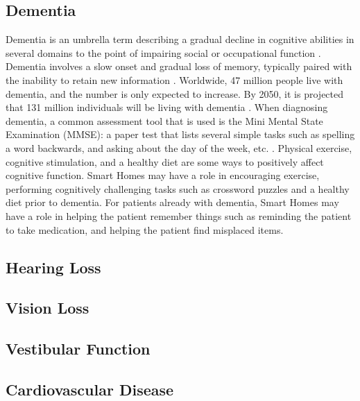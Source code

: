 \subsection{Dementia}
Dementia is an umbrella term describing a gradual decline in cognitive abilities in several domains to the point of impairing social or occupational function \cite{noauthor_diagnosis_nodate}. Dementia involves a slow onset and gradual loss of memory, typically paired with the inability to retain new information \cite{noauthor_diagnosis_nodate}. Worldwide, 47 million people live with dementia, and the number is only expected to increase. By 2050, it is projected that 131 million individuals will be living with dementia \cite{noauthor_diagnosis_nodate}. When diagnosing dementia, a common assessment tool that is used is the Mini Mental State Examination (MMSE): a paper test that lists several simple tasks such as spelling a word backwards, and asking about the day of the week, etc. \cite{arevalo-rodriguez_mini-mental_2015}. Physical exercise, cognitive stimulation, and a healthy diet are some ways to positively affect cognitive function. Smart Homes may have a role in encouraging exercise, performing cognitively challenging tasks such as crossword puzzles and a healthy diet prior to dementia. For patients already with dementia, Smart Homes may have a role in helping the patient remember things such as reminding the patient to take medication, and helping the patient find misplaced items.

\subsection{Hearing Loss}

\subsection{Vision Loss}

\subsection{Vestibular Function}

\subsection{Cardiovascular Disease}
